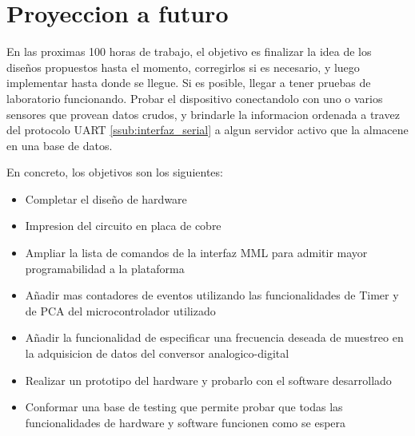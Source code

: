 \section{Proyeccion a futuro} %
\label{sec:proyeccion_a_futuro}

En las proximas 100 horas de trabajo, el objetivo es finalizar la idea de los dise\~nos propuestos hasta el momento, corregirlos si es necesario, y luego implementar hasta donde se llegue. Si es posible, llegar a tener pruebas de laboratorio funcionando. Probar el dispositivo conectandolo con uno o varios sensores que provean datos crudos, y brindarle la informacion ordenada a travez del protocolo UART \ref{ssub:interfaz_serial} a algun servidor activo que la almacene en una base de datos.

En concreto, los objetivos son los siguientes:
\begin{itemize}
	\item Completar el dise\~no de hardware
	\item Impresion del circuito en placa de cobre
	\item Ampliar la lista de comandos de la interfaz MML para admitir mayor programabilidad a la plataforma
	\item A\~nadir mas contadores de eventos utilizando las funcionalidades de Timer y de PCA del microcontrolador utilizado
	\item A\~nadir la funcionalidad de especificar una frecuencia deseada de muestreo en la adquisicion de datos del conversor analogico-digital
	\item Realizar un prototipo del hardware y probarlo con el software desarrollado
	\item Conformar una base de testing que permite probar que todas las funcionalidades de hardware y software funcionen como se espera
\end{itemize}


